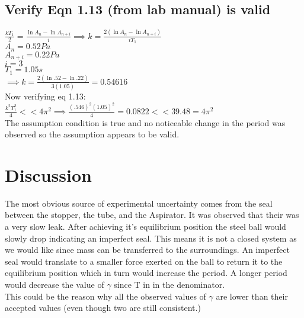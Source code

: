\documentclass{article}
\begin{document}
\subsection{Verify Eqn 1.13 (from lab manual) is valid}
$\frac{kT_1}{2} = \frac{\ln{A_n}-\ln{A_{n+i}}}{i} \implies k = \frac{2(\ln{A_n}-\ln{A_{n+i}})}{iT_1}$\\
$A_n=0.52Pa$\\
$A_{n+i}=0.22Pa$\\
$i=3$\\
$T_1 = 1.05s$\\
$\implies k =  \frac{2(\ln{.52}-\ln{.22})}{3(1.05)} = 0.54616$\\

Now verifying eq 1.13:\\
$\frac{k^2T_1^2}{4}<<4\pi^2 \implies \frac{(.546)^2(1.05)^2}{4} = 0.0822 << 39.48 = 4\pi^2 $\\
The assumption condition is true and no noticeable change in the period was observed so the assumption appears to be valid. 




\section{Discussion}
The most obvious source of experimental uncertainty comes from the seal between the stopper, the tube, and the Aspirator. It was observed that their was a very slow leak. After achieving it's equilibrium position the steel ball would slowly drop indicating an imperfect seal. This means it is not a closed system as we would like since mass can be transferred to the surroundings. An imperfect seal would translate to a smaller force exerted on the ball to return it to the equilibrium position which in turn would increase the period. A longer period would decrease the value of $\gamma$ since T in in the denominator.\\
This could be the reason why all the observed values of $\gamma$ are lower than their accepted values (even though two are still consistent.)
\end{document}
